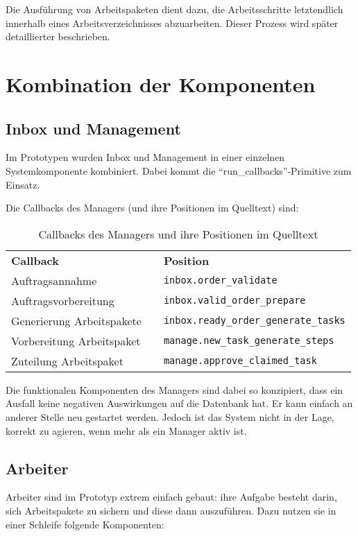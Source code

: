 Die Ausführung von Arbeitspaketen dient dazu,
die Arbeitsschritte letztendlich innerhalb eines Arbeitsverzeichnisses abzuarbeiten.
Dieser Prozess wird später detaillierter beschrieben.


\section{Kombination der Komponenten}
\label{sec:imp:kombination}

\subsection{Inbox und Management}

Im Prototypen wurden Inbox und Management in einer einzelnen Systemkomponente  kombiniert.
Dabei kommt die ``run\_callbacks''-Primitive zum Einsatz.

Die Callbacks des Managers (und ihre Positionen im Quelltext) sind:
\begin{table}[h]
\begin{tabular}{lcl}
    \textbf{Callback} && \textbf{Position} \\
    Auftragsannahme && \verb|inbox.order_validate| \\
    Auftragsvorbereitung && \verb|inbox.valid_order_prepare| \\
    Generierung Arbeitspakete && \verb|inbox.ready_order_generate_tasks| \\
    Vorbereitung Arbeitspaket && \verb|manage.new_task_generate_steps| \\
    Zuteilung Arbeitspaket && \verb|manage.approve_claimed_task| \\
\end{tabular}
\caption{Callbacks des Managers und ihre Positionen im Quelltext}
\label{tab:callbacks-manager}
\end{table}

Die funktionalen Komponenten des Managers sind dabei so konzipiert,
dass ein Ausfall keine negativen Auswirkungen auf die Datenbank hat.
Er kann einfach an anderer Stelle neu gestartet werden.
Jedoch ist das System nicht in der Lage, korrekt zu agieren, wenn mehr als ein Manager aktiv ist.

\subsection{Arbeiter}

Arbeiter sind im Prototyp extrem einfach gebaut:
ihre Aufgabe besteht darin, sich Arbeitspakete zu sichern
und diese dann auszuführen.
Dazu nutzen sie in einer Schleife folgende Komponenten:

